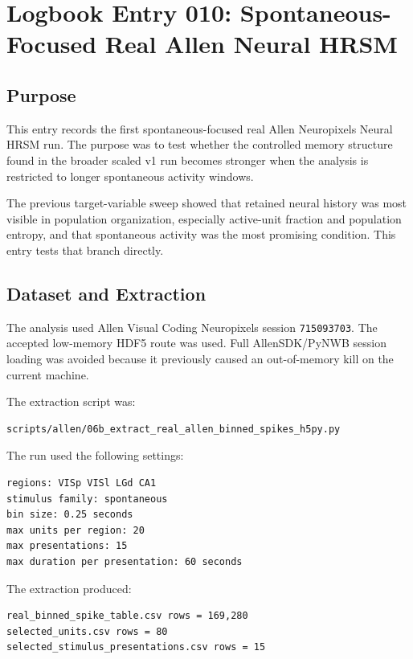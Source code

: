 \section{Logbook Entry 010: Spontaneous-Focused Real Allen Neural HRSM}
\label{sec:logbook-entry-010-spontaneous-focused-real-allen}

\subsection{Purpose}

This entry records the first spontaneous-focused real Allen Neuropixels Neural HRSM run. The purpose was to test whether the controlled memory structure found in the broader scaled v1 run becomes stronger when the analysis is restricted to longer spontaneous activity windows.

The previous target-variable sweep showed that retained neural history was most visible in population organization, especially active-unit fraction and population entropy, and that spontaneous activity was the most promising condition. This entry tests that branch directly.

\subsection{Dataset and Extraction}

The analysis used Allen Visual Coding Neuropixels session \texttt{715093703}. The accepted low-memory HDF5 route was used. Full AllenSDK/PyNWB session loading was avoided because it previously caused an out-of-memory kill on the current machine.

The extraction script was:

\begin{verbatim}
scripts/allen/06b_extract_real_allen_binned_spikes_h5py.py
\end{verbatim}

The run used the following settings:

\begin{verbatim}
regions: VISp VISl LGd CA1
stimulus family: spontaneous
bin size: 0.25 seconds
max units per region: 20
max presentations: 15
max duration per presentation: 60 seconds
\end{verbatim}

The extraction produced:

\begin{verbatim}
real_binned_spike_table.csv rows = 169,280
selected_units.csv rows = 80
selected_stimulus_presentations.csv rows = 15
\end{verbatim}

